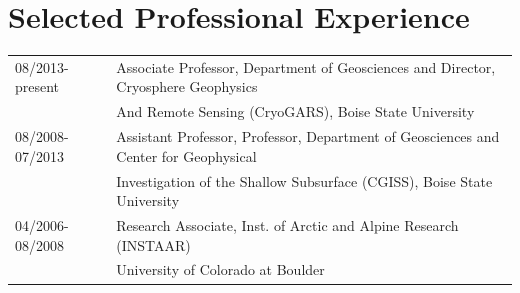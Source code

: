 \documentclass[11pt]{article}
\renewcommand\arraystretch{1}
\begin{document}
\section*{Selected Professional Experience}
\begin{tabular}{ll}
08/2013-present & Associate Professor, Department of Geosciences and Director, Cryosphere Geophysics \\
&  And Remote Sensing (CryoGARS), Boise State University \\
08/2008-07/2013 & Assistant Professor, Professor, Department of Geosciences and Center for Geophysical \\
&   Investigation of the Shallow Subsurface (CGISS), Boise State University \\
04/2006-08/2008 & Research Associate, Inst. of Arctic and Alpine Research (INSTAAR) \\
& University of Colorado at Boulder \\ 
\end{tabular}

%
%
\end{document}
